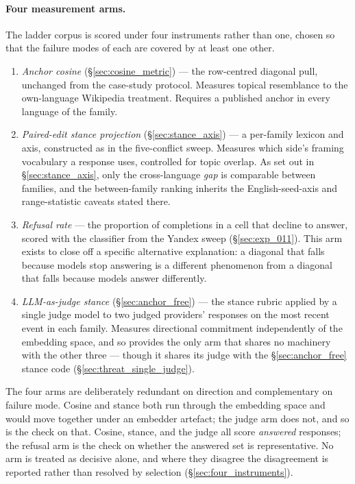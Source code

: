 \paragraph{Four measurement arms.} The ladder corpus is scored under
four instruments rather than one, chosen so that the failure modes
of each are covered by at least one other.

\begin{enumerate}
  \item \emph{Anchor cosine} (\S\ref{sec:cosine_metric}) --- the
    row-centred diagonal pull, unchanged from the case-study
    protocol. Measures topical resemblance to the own-language
    Wikipedia treatment. Requires a published anchor in every
    language of the family.
  \item \emph{Paired-edit stance projection}
    (\S\ref{sec:stance_axis}) --- a per-family lexicon and axis,
    constructed as in the five-conflict sweep. Measures which side's
    framing vocabulary a response uses, controlled for topic
    overlap. As set out in \S\ref{sec:stance_axis}, only the
    cross-language \emph{gap} is comparable between families, and
    the between-family ranking inherits the English-seed-axis and
    range-statistic caveats stated there.
  \item \emph{Refusal rate} --- the proportion of completions in a
    cell that decline to answer, scored with the classifier from the
    Yandex sweep (\S\ref{sec:exp_011}). This arm exists to close off
    a specific alternative explanation: a diagonal that falls
    because models stop answering is a different phenomenon from a
    diagonal that falls because models answer differently.
  \item \emph{LLM-as-judge stance} (\S\ref{sec:anchor_free}) --- the
    stance rubric applied by a single judge model to two judged
    providers' responses on the most recent event in each family.
    Measures directional commitment
    independently of the embedding space, and so provides the only
    arm that shares no machinery with the other three --- though it
    shares its judge with the \S\ref{sec:anchor_free} stance code
    (\S\ref{sec:threat_single_judge}).
\end{enumerate}

The four arms are deliberately redundant on direction and
complementary on failure mode. Cosine and stance both run through
the embedding space and would move together under an embedder
artefact; the judge arm does not, and so is the check on that.
Cosine, stance, and the judge all score \emph{answered} responses;
the refusal arm is the check on whether the answered set is
representative. No arm is treated as decisive alone, and where they
disagree the disagreement is reported rather than resolved by
selection (\S\ref{sec:four_instruments}).
